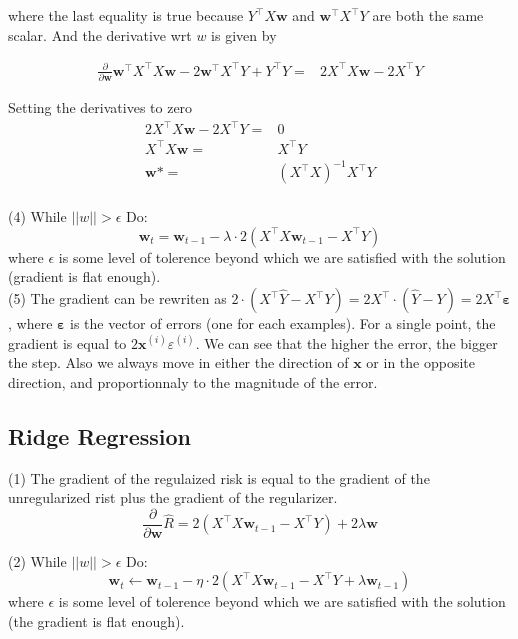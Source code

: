 \documentclass[11pt,english]{article}
\newcommand{\pd}[1]{\frac{\partial}{\partial {#1}}}
\begin{document}
    where the last equality is true because $Y^\top X\bm{w}$ and $\bm{w}^\top X^\top Y$ are both the same scalar. And the derivative wrt $w$ is given by

    \begin{equation}
        \begin{split}
            \pd{\bm{w}} \bm{w}^\top X^\top X\bm{w} - 2\bm{w}^\top X^\top Y  + Y^\top Y
            =& 2X^\top X\bm{w} - 2 X^\top Y 
        \end{split}
    \end{equation}

    Setting the derivatives to zero
    \begin{equation}
        \begin{split}
            2X^\top X\bm{w} - 2 X^\top Y =& 0 \\
            X^\top X\bm{w}  =& X^\top Y \\
            \bm{w}*  =& (X^\top X)^{-1} X^\top Y \\
        \end{split}
    \end{equation}

    (4) While $||w||>\epsilon$ Do:
    $$
        \bm{w}_t = \bm{w}_{t-1} - \lambda \cdot 2(X^\top X\bm{w}_{t-1} - X^\top Y)
    $$
    where $\epsilon$ is some level of tolerence beyond which we are satisfied with the solution (gradient is flat enough).\\

    (5) The gradient can be rewriten as $2\cdot (X^\top \hat{Y} - X^\top Y)=2X^\top\cdot (\hat{Y} - Y)=2X^\top \bm{\varepsilon}$, where $\bm{\varepsilon}$ is the vector of errors (one for each examples). For a single point, the gradient is equal to $2\bm{x}^{(i)}\varepsilon^{(i)}$. We can see that the higher the error, the bigger the step. Also we always move in either the direction of $\bm{x}$ or in the opposite direction, and proportionnaly to the magnitude of the error.
    
    \subsection{Ridge Regression}

    (1) The gradient of the regulaized risk is equal to the gradient of the unregularized rist plus the gradient of the regularizer.
    \[
        \pd{\bm{w}} \hat{R} = 2(X^\top X\bm{w}_{t-1} - X^\top Y) + 2 \lambda \bm{w}
    \]

    (2) While $||w||>\epsilon$ Do:
    $$
        \bm{w}_t \leftarrow \bm{w}_{t-1} - \eta \cdot 2(X^\top X\bm{w}_{t-1} - X^\top Y + \lambda \bm{w}_{t-1})
    $$
    where $\epsilon$ is some level of tolerence beyond which we are satisfied with the solution (the gradient is flat enough).\\
\end{document}
